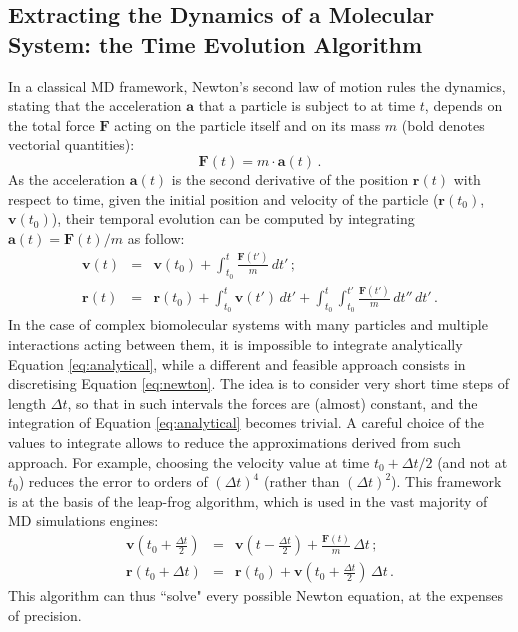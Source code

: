 \documentclass[graybox]{svmult}
\begin{document}
\subsection{Extracting the Dynamics of a Molecular System: the Time Evolution Algorithm}
In a classical MD framework, Newton's second law of motion rules the dynamics, stating that the acceleration $\textbf{a}$ that a particle is subject to at time $t$, depends on the total force $\textbf{F}$ acting on the particle itself and on its mass $m$ (bold denotes vectorial quantities):
\begin{equation} \label{eq:newton}
\textbf{F}(t) =  m \cdot \textbf{a}(t) \, .
\end{equation}
As the acceleration $\textbf{a}(t)$ is the second derivative of the position $\textbf{r}(t)$ with respect to time, given the initial position and velocity of the particle ($\textbf{r}(t_0)$, $\textbf{v}(t_0)$), their temporal evolution can be computed by integrating $\textbf{a}(t) = \textbf{F}(t)/m$ as follow:
\begin{eqnarray} \label{eq:analytical}
\mathbf{v}(t) &=& \mathbf{v}(t_0) + \int_{t_0}^t \frac{\mathbf{F}(t')}{m} \, dt' \, ; \\
\mathbf{r}(t) &=& \mathbf{r}(t_0) + \int_{t_0}^t \mathbf{v}(t') \, dt' + \int_{t_0}^t \int_{t_0}^{t'} \frac{\mathbf{F}(t')}{m} \, dt'' \, dt'\, .
\end{eqnarray}
In the case of complex biomolecular systems with many particles and multiple interactions acting between them, it is impossible to integrate analytically Equation \ref{eq:analytical}, while a different and feasible approach consists in discretising Equation \ref{eq:newton}.
%
The idea is to consider very short time steps of length $\Delta t$, so that in such intervals the forces are (almost) constant, and the integration of Equation \ref{eq:analytical} becomes trivial.
%
A careful choice of the values to integrate allows to reduce the approximations derived from such approach.
For example, choosing the velocity value at time $t_0 + \Delta t/2$ (and not at $t_0$) reduces the error to orders of $(\Delta t)^4$ (rather than $(\Delta t)^2$). This framework is at the basis of the leap-frog algorithm, which is used in the vast majority of MD simulations engines:
\begin{eqnarray}
\mathbf{v}\left(t_0 + \frac{\Delta t}{2}\right) &=& \mathbf{v}\left(t - \frac{\Delta t}{2}\right) + \frac{\mathbf{F}(t)}{m} \, \Delta t \, ; \\
\mathbf{r}(t_0 + \Delta t) &=& \mathbf{r}(t_0) + \mathbf{v}\left(t_0 + \frac{\Delta t}{2}\right) \, \Delta t \, .
\end{eqnarray}
This algorithm can thus ``solve" every possible Newton equation, at the expenses of precision.
\end{document}
